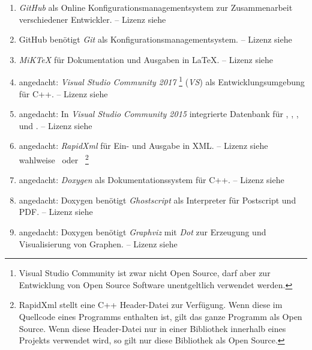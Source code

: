\begin{enumerate}
	\setcounter{enumi}{\value{Enumi}}%

	\item\label{Werkzeug:GitHub}\emph{GitHub} als Online Konfigurationsmanagementsystem zur Zusammenarbeit verschiedener Entwickler.
	-- Lizenz siehe~\cite{bib:GPLii}

	\item\label{Werkzeug:Git}GitHub benötigt \emph{Git} als Konfigurationsmanagementsystem.
	-- Lizenz siehe~\cite{bib:GPLii}

	\item\label{Werkzeug:MiKTeX}\emph{MiK\TeX} für Dokumentation und Ausgaben in \LaTeX.
	-- Lizenz siehe~\cite{bib:MiKTeX}

	\item\label{Werkzeug:VSC}angedacht: \emph{Visual Studio Community 2017}%
	\footnote{%
		Visual Studio Community ist zwar nicht Open Source, darf aber zur Entwicklung von Open Source Software
		unentgeltlich verwendet werden.%
	}
	(\emph{VS}) als Entwicklungsumgebung für C++.
	-- Lizenz siehe~\cite{bib:EULA}

	\item\label{Werkzeug:VSC DB}angedacht: In \emph{Visual Studio Community 2015} integrierte Datenbank für , , ,  und .
	-- Lizenz siehe~\cite{bib:EULA}

	\item\label{Werkzeug:RapidXml}angedacht: \emph{RapidXml} für Ein- und Ausgabe in XML.
	-- Lizenz siehe wahlweise~\cite{bib:BSLi} oder~\cite{bib:MIT}
	\footnote{%
		RapidXml stellt eine C++ Header-Datei zur Verfügung.
		Wenn diese im Quellcode eines Programms enthalten ist, gilt das ganze Programm als Open Source.
		Wenn diese Header-Datei nur in einer Bibliothek innerhalb eines Projekts verwendet wird, so gilt nur diese Bibliothek als Open Source.%
	}

	\item\label{Werkzeug:Doxygen}angedacht: \emph{Doxygen} als Dokumentationssystem für C++.
	-- Lizenz siehe~\cite{bib:GPLii}

	\item\label{Werkzeug:Ghostscript}angedacht: Doxygen benötigt \emph{Ghostscript} als Interpreter für Postscript und PDF.
	-- Lizenz siehe~\cite{bib:AGPL}

	\item\label{Werkzeug:Graphviz}angedacht: Doxygen benötigt \emph{Graphviz} mit \emph{Dot} zur Erzeugung und Visualisierung von Graphen.
	-- Lizenz siehe~\cite{bib:EPL}

	\setcounter{Enumi}{\value{enumi}}%
\end{enumerate}

